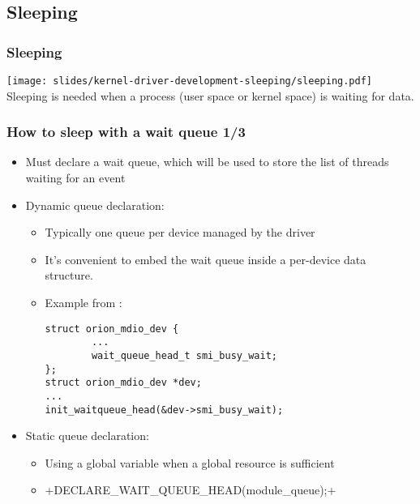 \subsection{Sleeping}

\begin{frame}
  \frametitle{Sleeping}
  \begin{center}
    \texttt{[image: slides/kernel-driver-development-sleeping/sleeping.pdf]}\\
    Sleeping is needed when a process (user space or kernel space) is
    waiting for data.
  \end{center}
\end{frame}

\begin{frame}[fragile]
  \frametitle{How to sleep with a wait queue 1/3}
  \begin{itemize}
  \item Must declare a wait queue, which will be used to store the list of threads
        waiting for an event
  \item Dynamic queue declaration:
      \begin{itemize}
      \item Typically one queue per device managed by the driver
      \item It's convenient to embed the wait queue inside a per-device data
        structure.
      \item Example from :
\begin{verbatim}
struct orion_mdio_dev {
        ...
        wait_queue_head_t smi_busy_wait;
};
struct orion_mdio_dev *dev;
...
init_waitqueue_head(&dev->smi_busy_wait);
\end{verbatim}
    \end{itemize}
    \item Static queue declaration:
      \begin{itemize}
      \item Using a global variable when a global resource is sufficient
      \item {}+DECLARE_WAIT_QUEUE_HEAD(module_queue);+
      \end{itemize}
  \end{itemize}
\end{frame}

